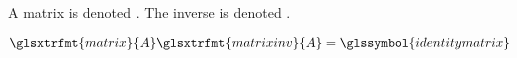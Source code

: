 \documentclass{article}
\begin{document}
A \gls{matrix} is denoted .
The inverse is denoted .

\newpage

\[
  \glsxtrfmt{matrix}{A}
  \glsxtrfmt{matrixinv}{A}
  =
  \glssymbol{identitymatrix}
\]

\newpage

\printglossaries
\end{document}
